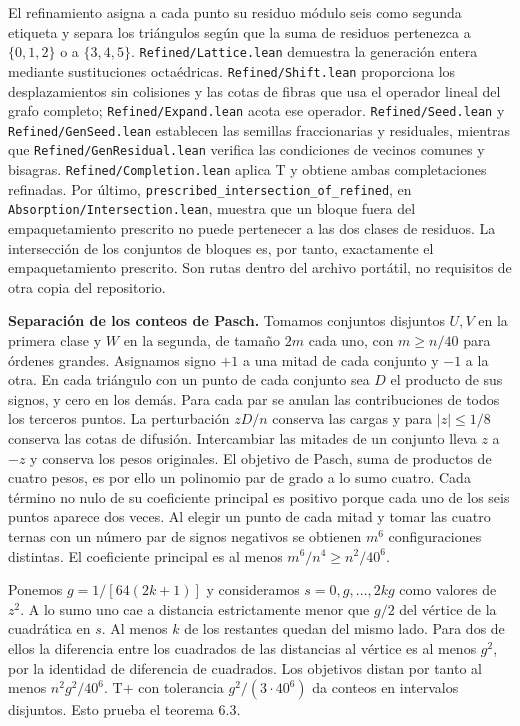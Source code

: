 \documentclass[spanish,11pt,a4paper]{article}
\begin{document}
El refinamiento asigna a cada punto su residuo módulo seis como segunda etiqueta y separa los triángulos según que la suma de residuos pertenezca a \(\{0,1,2\}\) o a \(\{3,4,5\}\). \texttt{Refined/\allowbreak{}Lattice.\allowbreak{}lean} demuestra la generación entera mediante sustituciones octaédricas. \texttt{Refined/\allowbreak{}Shift.\allowbreak{}lean} proporciona los desplazamientos sin colisiones y las cotas de fibras que usa el operador lineal del grafo completo; \texttt{Refined/\allowbreak{}Expand.\allowbreak{}lean} acota ese operador. \texttt{Refined/\allowbreak{}Seed.\allowbreak{}lean} y \texttt{Refined/\allowbreak{}Gen\allowbreak{}Seed.\allowbreak{}lean} establecen las semillas fraccionarias y residuales, mientras que \texttt{Refined/\allowbreak{}Gen\allowbreak{}Residual.\allowbreak{}lean} verifica las condiciones de vecinos comunes y bisagras. \texttt{Refined/\allowbreak{}Completion.\allowbreak{}lean} aplica T y obtiene ambas completaciones refinadas. Por último, \texttt{prescribed\_\allowbreak{}intersection\_\allowbreak{}of\_\allowbreak{}refined}, en \texttt{Absorption/\allowbreak{}Intersection.\allowbreak{}lean}, muestra que un bloque fuera del empaquetamiento prescrito no puede pertenecer a las dos clases de residuos. La intersección de los conjuntos de bloques es, por tanto, exactamente el empaquetamiento prescrito. Son rutas dentro del archivo portátil, no requisitos de otra copia del repositorio.

\textbf{Separación de los conteos de Pasch.} Tomamos conjuntos disjuntos \(U,V\) en la primera clase y \(W\) en la segunda, de tamaño \(2m\) cada uno, con \(m\ge n/40\) para órdenes grandes. Asignamos signo \(+1\) a una mitad de cada conjunto y \(-1\) a la otra. En cada triángulo con un punto de cada conjunto sea \(D\) el producto de sus signos, y cero en los demás. Para cada par se anulan las contribuciones de todos los terceros puntos. La perturbación \(zD/n\) conserva las cargas y para \(|z|\le1/8\) conserva las cotas de difusión. Intercambiar las mitades de un conjunto lleva \(z\) a \(-z\) y conserva los pesos originales. El objetivo de Pasch, suma de productos de cuatro pesos, es por ello un polinomio par de grado a lo sumo cuatro. Cada término no nulo de su coeficiente principal es positivo porque cada uno de los seis puntos aparece dos veces. Al elegir un punto de cada mitad y tomar las cuatro ternas con un número par de signos negativos se obtienen \(m^6\) configuraciones distintas. El coeficiente principal es al menos \(m^6/n^4\ge n^2/40^6\).

Ponemos \(g=1/[64(2k+1)]\) y consideramos \(s=0,g,\ldots,2kg\) como valores de \(z^2\). A lo sumo uno cae a distancia estrictamente menor que \(g/2\) del vértice de la cuadrática en \(s\). Al menos \(k\) de los restantes quedan del mismo lado. Para dos de ellos la diferencia entre los cuadrados de las distancias al vértice es al menos \(g^2\), por la identidad de diferencia de cuadrados. Los objetivos distan por tanto al menos \(n^2g^2/40^6\). T+ con tolerancia \(g^2/(3\cdot40^6)\) da conteos en intervalos disjuntos. Esto prueba el teorema 6.3.
\end{document}
